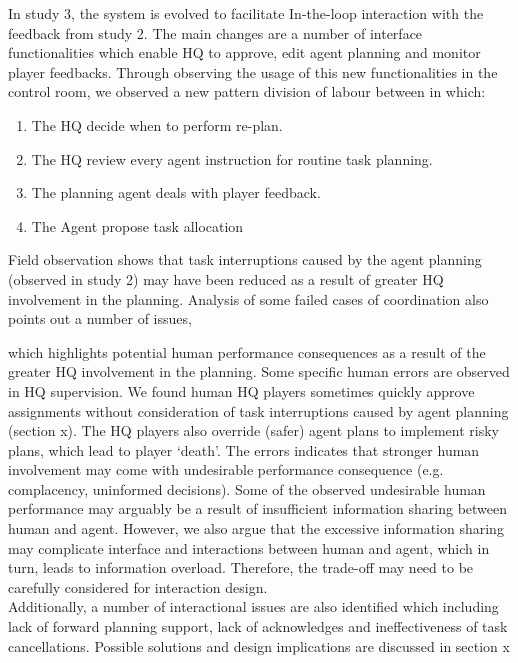 In study 3, the system is evolved to facilitate In-the-loop interaction with the feedback from study 2. The main changes are a number of interface functionalities which enable HQ to approve, edit agent planning and monitor player feedbacks. Through observing the usage of this new functionalities in the control room, we observed a new pattern division of labour between in which:
	\begin{enumerate}
	 \item The HQ decide when to perform re-plan.
	 \item The HQ review every agent instruction for routine task planning.
	 \item The planning agent deals with player feedback.
	 \item The Agent propose task allocation
	\end{enumerate}
	
Field observation shows that task interruptions caused by the agent planning (observed in study 2) may have been reduced as a result of greater HQ involvement in the planning. Analysis of some failed cases of coordination also points out a number of issues,


which highlights potential human performance consequences as a result of the greater HQ involvement in the planning. Some specific human errors are observed in HQ supervision. We found human HQ players sometimes quickly approve assignments without consideration of task interruptions caused by agent planning (section x). The HQ players also override (safer) agent plans to implement risky plans, which lead to player `death'. The errors indicates that stronger human involvement may come with undesirable performance consequence (e.g. complacency, uninformed decisions). Some of the observed undesirable human performance may arguably be a result of insufficient information sharing between human and agent. However, we also argue that the excessive information sharing may complicate interface and interactions between human and agent, which in turn, leads to information overload. Therefore, the trade-off may need to be carefully considered for interaction design. \\

Additionally, a number of interactional issues are also identified which including lack of forward planning support, lack of acknowledges and ineffectiveness of task cancellations. Possible solutions and design implications are discussed in section x \\



